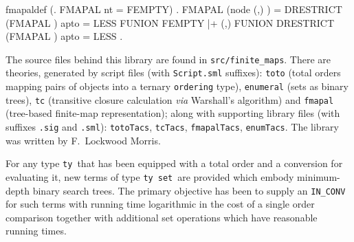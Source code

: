 \begin{SaveVerbatim}{fmapaldef}
\HOLTokenTurnstile{} (\HOLTokenForall{}. FMAPAL  nt = FEMPTY) \HOLTokenConj{}
   \HOLTokenForall{}    .
     FMAPAL  (node  (,) ) =
     DRESTRICT (FMAPAL  ) \HOLTokenLeftbrace{} \HOLTokenBar{} apto    = LESS\HOLTokenRightbrace{} FUNION
     FEMPTY |+ (,) FUNION
     DRESTRICT (FMAPAL  ) \HOLTokenLeftbrace{} \HOLTokenBar{} apto    = LESS\HOLTokenRightbrace{} .
\end{SaveVerbatim}
\newcommand{\bt}{{\tt bt}}
\newcommand{\bl}{{\tt bl}}
\newcommand{\lty}{{\tt ty}}
\newcommand{\typrime}{{\tt ty'}}
\newcommand{\cpn}{{\tt cpn}}
\newcommand{\cmp}{{\tt cmp}}
\newcommand{\toto}{{\tt toto}}
\newcommand{\set}{{\tt set}}
\newcommand{\fmap}{\mbox{\tt fmap}}
\newcommand{\thm}{\mathtt{thm}}
\newcommand{\conv}{\mathtt{conv}}
\newcommand{\ra}{\rightarrow}
%
%
%
%
The source files behind this library are found in \texttt{src/finite\_maps}.
There are theories, generated by script files (with \texttt{Script.sml} suffixes): \texttt{toto} (total orders mapping pairs of objects into a ternary \texttt{ordering} type), \texttt{enumeral} (sets as binary trees), \texttt{tc} (transitive closure calculation \emph{via} Warshall's algorithm) and \texttt{fmapal} (tree-based finite-map representation);
along with supporting library files (with suffixes \texttt{.sig} and \texttt{.sml}): \texttt{totoTacs}, \texttt{tcTacs}, \texttt{fmapalTacs}, \texttt{enumTacs}.
The library was written by F.~Lockwood Morris.

For any type \lty\ that has been equipped with a total order and a
conversion for evaluating it, new terms of type \lty\ \set\ are provided
which embody minimum-depth binary search trees. The primary
objective has been to supply an \verb$IN_CONV$ for such terms with
running time logarithmic in the cost of a single order comparison together
with additional set operations which have reasonable running times.

